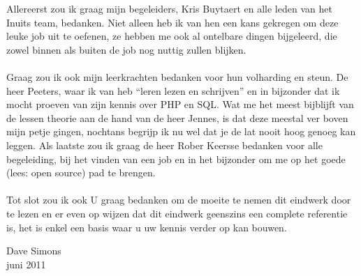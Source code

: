 %
%
%
%
Allereerst zou ik graag mijn begeleiders, Kris Buytaert en alle leden van het Inuits team, bedanken. Niet alleen heb ik van hen een kans gekregen om deze leuke job uit te oefenen, ze hebben me ook al ontelbare dingen bijgeleerd, die zowel binnen als buiten de job nog nuttig zullen blijken.\\\\
Graag zou ik ook mijn leerkrachten bedanken voor hun volharding en steun. De heer Peeters, waar ik van heb ``leren lezen en schrijven'' en in bijzonder dat ik mocht proeven van zijn kennis over PHP en SQL. Wat me het meest bijblijft van de lessen theorie aan de hand van de heer Jennes, is dat deze meestal ver boven mijn petje gingen, nochtans begrijp ik nu wel dat je de lat nooit hoog genoeg kan leggen. Als laatste zou ik graag de heer Rober Keersse bedanken voor alle begeleiding, bij het vinden van een job en in het bijzonder om me op het goede (lees: open source) pad te brengen.\\\\
Tot slot zou ik ook U graag bedanken om de moeite te nemen dit eindwerk door te lezen en er even op wijzen dat dit eindwerk geenszins een complete referentie is, het is enkel een basis waar u uw kennis verder op kan bouwen.\\

\begin{flushright}Dave Simons\\juni 2011\end{flushright}
